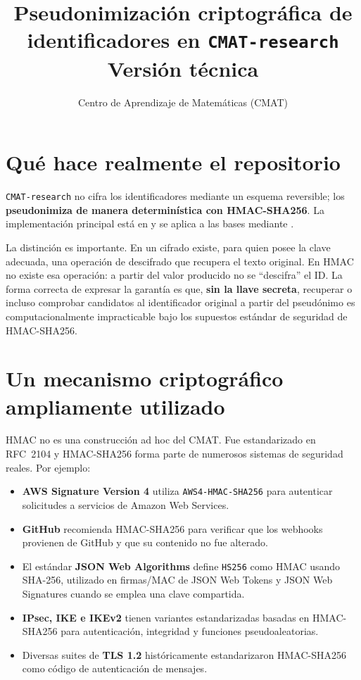 \documentclass[11pt,a4paper]{article}
\title{Pseudonimización criptográfica de identificadores en \texttt{CMAT-research}\\\large Versión técnica}
\author{Centro de Aprendizaje de Matemáticas (CMAT)}
\date{}
\begin{document}
\maketitle

\section{Qué hace realmente el repositorio}

\texttt{CMAT-research} no cifra los identificadores mediante un esquema reversible; los \textbf{pseudonimiza de manera determinística con HMAC-SHA256}. La implementación principal está en  y se aplica a las bases mediante .

La distinción es importante. En un cifrado existe, para quien posee la clave adecuada, una operación de descifrado que recupera el texto original. En HMAC no existe esa operación: a partir del valor producido no se ``descifra'' el ID. La forma correcta de expresar la garantía es que, \textbf{sin la llave secreta}, recuperar o incluso comprobar candidatos al identificador original a partir del pseudónimo es computacionalmente impracticable bajo los supuestos estándar de seguridad de HMAC-SHA256.

\section{Un mecanismo criptográfico ampliamente utilizado}

HMAC no es una construcción ad hoc del CMAT. Fue estandarizado en RFC~2104 y HMAC-SHA256 forma parte de numerosos sistemas de seguridad reales. Por ejemplo:

\begin{itemize}[leftmargin=*]
    \item \textbf{AWS Signature Version 4} utiliza \texttt{AWS4-HMAC-SHA256} para autenticar solicitudes a servicios de Amazon Web Services.
    \item \textbf{GitHub} recomienda HMAC-SHA256 para verificar que los webhooks provienen de GitHub y que su contenido no fue alterado.
    \item El estándar \textbf{JSON Web Algorithms} define \texttt{HS256} como HMAC usando SHA-256, utilizado en firmas/MAC de JSON Web Tokens y JSON Web Signatures cuando se emplea una clave compartida.
    \item \textbf{IPsec, IKE e IKEv2} tienen variantes estandarizadas basadas en HMAC-SHA256 para autenticación, integridad y funciones pseudoaleatorias.
    \item Diversas suites de \textbf{TLS 1.2} históricamente estandarizaron HMAC-SHA256 como código de autenticación de mensajes.
\end{itemize}
\end{document}
